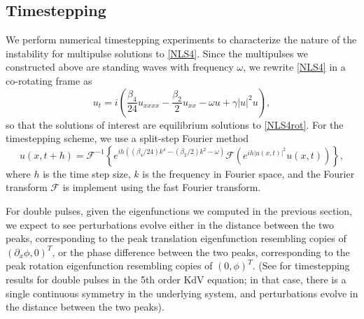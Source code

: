 \documentclass[12pt]{elsarticle}
\def\calF{{\mathcal F}}
\begin{document}
\subsection{Timestepping}

We perform numerical timestepping experiments to characterize the nature of the instability for multipulse solutions to \cref{NLS4}. Since the multipulses we constructed above are standing waves with frequency $\omega$, we rewrite \cref{NLS4} in a co-rotating frame as 
\begin{equation}\label{NLS4rot}
u_t = i\left( \frac{\beta_4}{24}u_{xxxx} - \frac{\beta_2}{2}u_{xx} - \omega u + \gamma |u|^2 u \right),
\end{equation}
so that the solutions of interest are equilibrium solutions to \cref{NLS4rot}. For the timestepping scheme, we use a split-step Fourier method \cite{Agrawal2013,Bogomolov2006} 
\begin{equation}\label{eq:splitstep}
u(x,t+h) = \calF^{-1} \left\{  e^{i h \left( (\beta_4/24) k^4 - (\beta_2/2)k^2 - \omega \right) } \calF\left( e^{ih |u(x,t)|^2} u(x,t) \right) \right\},
\end{equation}
where $h$ is the time step size, $k$ is the frequency in Fourier space, and the Fourier transform $\calF$ is implement using the fast Fourier transform.

For double pulses, given the eigenfunctions we computed in the previous section, we expect to see perturbations evolve either in the distance between the two peaks, corresponding to the peak translation eigenfunction resembling copies of $(\partial_x \phi, 0)^T$, or the phase difference between the two peaks, corresponding to the peak rotation eigenfunction resembling copies of $(0, \phi)^T$. (See \cite[Figure 9]{Pelinovsky2007} for timestepping results for double pulses in the 5th order KdV equation; in that case, there is a single continuous symmetry in the underlying system, and perturbations evolve in the distance between the two peaks).
\end{document}
